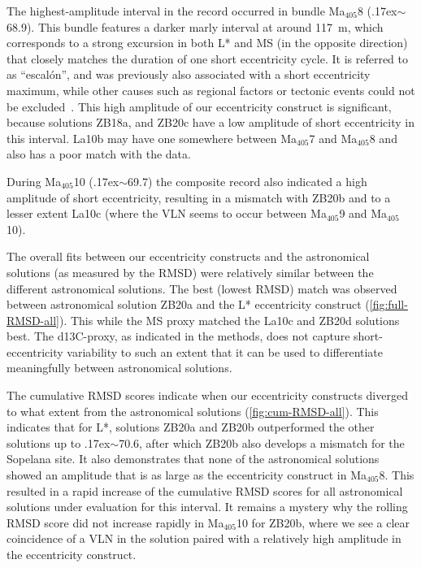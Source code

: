 \documentclass[draft]{agujournal2019}
\newcommand{\appr}{\raise.17ex\hbox{\(\scriptstyle\sim\)}} %
\newcommand{\ma}[1]{Ma\(_{405}\)#1} %
\begin{document}
The highest-amplitude interval in the record occurred in bundle \ma{8} (\appr\qty{68.9}{\millionyearago}).
This bundle features a darker marly interval at around \qty{117}{\metre}, which corresponds to a strong excursion in both \gls{L*} and \gls{MS} (in the opposite direction) that closely matches the duration of one short eccentricity cycle.
It is referred to as ``escal\'{o}n'', and was previously also associated with a short eccentricity maximum, while other causes such as regional factors or tectonic events could not be excluded~\cite{Dinares-Turell2013}.
This high amplitude of our eccentricity construct is significant, because solutions ZB18a, and ZB20c have a low amplitude of short eccentricity in this interval.
La10b may have one somewhere between \ma{7} and \ma{8} and also has a poor match with the data.

During \ma{10} (\appr\qty{69.7}{\millionyearago}) the composite record also indicated a high amplitude of short eccentricity, resulting in a mismatch with ZB20b and to a lesser extent La10c (where the \gls{VLN} seems to occur between \ma{9} and \ma{10}).

The overall fits between our eccentricity constructs and the astronomical solutions (as measured by the \gls{RMSD}) were relatively similar between the different astronomical solutions.
The best (lowest \gls{RMSD}) match was observed between astronomical solution ZB20a and the \gls{L*} eccentricity construct (\cref{fig:full-RMSD-all}).
This while the \gls{MS} proxy matched the La10c and ZB20d solutions best.
The \gls{d13C}-proxy, as indicated in the methods, does not capture short-eccentricity variability to such an extent that it can be used to differentiate meaningfully between astronomical solutions.

The cumulative RMSD scores indicate when our eccentricity constructs diverged to what extent from the astronomical solutions (\cref{fig:cum-RMSD-all}).
This indicates that for \gls{L*}, solutions ZB20a and ZB20b outperformed the other solutions up to \appr\qty{70.6}{\millionyearago}, after which ZB20b also develops a mismatch for the Sopelana site.
It also demonstrates that none of the astronomical solutions showed an amplitude that is as large as the eccentricity construct in \ma{8}.
This resulted in a rapid increase of the cumulative \gls{RMSD} scores for all astronomical solutions under evaluation for this interval.
It remains a mystery why the rolling \gls{RMSD} score did not increase rapidly in \ma{10} for ZB20b, where we see a clear coincidence of a \gls{VLN} in the solution paired with a relatively high amplitude in the eccentricity construct.
\end{document}
